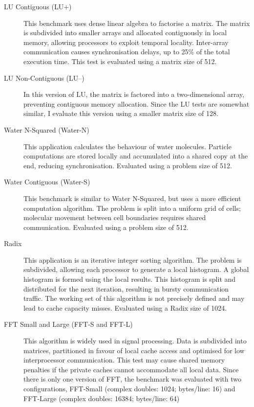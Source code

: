 		\label{test_settings_splash}
		\begin{description}
			\item[LU Contiguous (LU+)] This benchmark uses dense linear algebra to factorise a matrix. The matrix is subdivided into smaller arrays and allocated contiguously in local memory, allowing processors to exploit temporal locality. Inter-array communication causes synchronisation delays, up to 25\% of the total execution time. 
			This test is evaluated using a matrix size of 512.
			
			\item[LU Non-Contiguous (LU--)] In this version of LU, the matrix is factored into a two-dimensional array, preventing contiguous memory allocation. Since the LU tests are somewhat similar, I evaluate this version using a smaller matrix size of 128.

			\item[Water N-Squared (Water-N)] This application calculates the behaviour of water molecules. Particle computations are stored locally and accumulated into a shared copy at the end, reducing synchronisation. Evaluated using a problem size of 512.

			\item[Water Contiguous (Water-S)] This benchmark is similar to Water N-Squared, but uses a more efficient computation algorithm. The problem is split into a uniform grid of cells; molecular movement between cell boundaries requires shared communication. Evaluated using a problem size of 512.
			
			\item[Radix] This application is an iterative integer sorting algorithm. The problem is subdivided, allowing each processor to generate a local histogram.
			A global histogram is formed using the local results. This histogram is split and distributed for the next iteration, resulting in bursty communication traffic. The working set of this algorithm is not precisely defined and may lead to cache capacity misses. Evaluated using a Radix size of 1024.
			
			\item[FFT Small and Large (FFT-S and FFT-L)] This algorithm is widely used in signal processing. Data is subdivided into matrices, partitioned in favour of local cache access and optimised for low interprocessor communication. This test may cause shared memory penalties if the private caches cannot accommodate all local data. Since there is only one version of FFT, the benchmark was evaluated with two configurations, FFT-Small (complex doubles: 1024; bytes/line: 16) and FFT-Large (complex doubles: 16384; bytes/line: 64)
			

\end{description}
